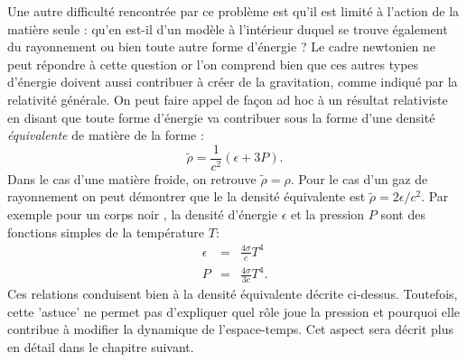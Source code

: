 Une autre difficulté rencontrée par ce problème est qu'il est limité à l'action de la matière seule : qu'en est-il d'un modèle à l'intérieur duquel se trouve également du rayonnement ou bien toute autre forme d'énergie ? Le cadre newtonien ne peut répondre à cette question or l'on comprend bien que ces autres types d'énergie doivent aussi contribuer à créer de la gravitation, comme indiqué par la relativité générale. On peut faire appel de façon ad hoc à un résultat relativiste en disant que toute forme d'énergie va contribuer sous la forme d'une densité \textit{équivalente} de matière de la forme :
\begin{equation}
\tilde \rho= \frac{1}{c^2}(\epsilon + 3P).
\end{equation}
Dans le cas d'une matière froide, on retrouve $\tilde \rho =\rho$. Pour le cas d'un gaz de rayonnement on peut démontrer que le la densité équivalente est $\tilde \rho =2\epsilon/c^2$. Par exemple pour un corps noir , la densité d'énergie $\epsilon$ et la pression $P$ sont des fonctions simples de la température $T$:
\begin{eqnarray}
\epsilon&=&\frac{4\sigma}{c} T^4\\
P&=&\frac{4\sigma}{3c} T^4.
\end{eqnarray}
Ces relations conduisent bien à la densité équivalente décrite ci-dessus. Toutefois, cette 'astuce' ne permet pas d'expliquer quel rôle joue la pression et pourquoi elle contribue à modifier la dynamique de l'espace-temps. Cet aspect sera décrit plus en détail dans le chapitre suivant.

